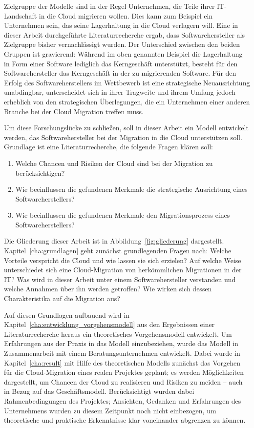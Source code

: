 Zielgruppe der Modelle sind in der Regel Unternehmen, die Teile ihrer
IT-Landschaft in die Cloud migrieren wollen. Dies kann zum Beispiel ein
Unternehmen sein, das
seine Lagerhaltung in die Cloud verlagern will. Eine in
dieser Arbeit durchgeführte Literaturrecherche ergab,
dass Softwarehersteller als Zielgruppe bisher vernachlässigt wurden. Der
Unterschied zwischen den beiden Gruppen ist gravierend: Während im oben
genannten Beispiel die
Lagerhaltung in Form einer Software lediglich das Kerngeschäft unterstützt,
besteht für den Softwarehersteller das Kerngeschäft in der zu migrierenden
Software. Für den Erfolg des Softwareherstellers im Wettbewerb ist eine strategische
Neuausrichtung
unabdingbar, unterscheidet sich in ihrer Tragweite und ihrem Umfang jedoch
erheblich von den strategischen Überlegungen, die ein Unternehmen einer anderen
Branche bei der Cloud Migration treffen muss.

Um diese Forschungslücke zu schließen, soll in dieser Arbeit ein Modell entwickelt werden, das
Softwarehersteller bei der Migration in die Cloud unterstützen soll. Grundlage
ist eine Literaturrecherche, die folgende Fragen klären soll:
\begin{enumerate}
	\item Welche Chancen und Risiken der Cloud sind bei der
Migration zu berücksichtigen?
	\item Wie beeinflussen die gefundenen Merkmale die strategische
Ausrichtung eines Softwareherstellers?
	\item Wie beeinflussen die gefundenen Merkmale den Migrationsprozess
eines Softwareherstellers?
\end{enumerate}

Die Gliederung dieser Arbeit ist in Abbildung~\ref{fig:gliederung} dargestellt.
Kapitel~\ref{cha:grundlagen} geht zunächst grundlegenden Fragen nach:
Welche Vorteile verspricht die Cloud und wie lassen sie sich erzielen? Auf
welche Weise unterschiedet sich eine Cloud-Migration von herkömmlichen
Migrationen in der IT? Was wird in dieser Arbeit unter einem Softwarehersteller
verstanden und welche Annahmen über ihn werden getroffen? Wie wirken sich dessen
Charakteristika auf die Migration aus?

Auf diesen Grundlagen aufbauend wird in Kapitel~\ref{cha:entwicklung_vorgehensmodell} aus den Ergebnissen einer Literaturrecherche heraus ein theoretisches Vorgehensmodell entwickelt. Um Erfahrungen aus der Praxis in das Modell einzubeziehen, wurde das Modell in
Zusammenarbeit mit einem Beratungsunternehmen entwickelt. Dabei wurde in Kapitel~\ref{cha:result} mit Hilfe des theoretischen Modells zunächst das Vorgehen für die Cloud-Migration eines realen Projektes geplant; es werden Möglichkeiten dargestellt, um Chancen der Cloud zu realisieren und Risiken zu meiden -- auch in Bezug auf das Geschäftsmodell. Berücksichtigt wurden dabei Rahmenbedingungen des Projektes; Ansichten, Gedanken und Erfahrungen des Unternehmens wurden zu diesem Zeitpunkt noch nicht einbezogen, um theoretische und praktische Erkenntnisse klar voneinander abgrenzen zu können.

